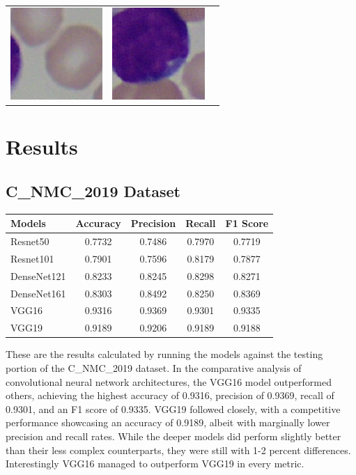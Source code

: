 \documentclass[
	a4paper,
	10pt,
	unnumberedsections,
	twoside,
]{research_article}
\begin{document}
\begin{tabular}{m{3.25cm} m{4cm} m{4cm}}
	\includegraphics[width=3.5cm]{images/Im001_1_window_221.jpg} & \includegraphics[width=3.5cm]{images/Im003_1_window_376.jpg} \\
\end{tabular}

\newpage\onecolumn
\section{Results}

\subsection{C\_NMC\_2019 Dataset}
\begin{table}[ht]
	\centering
	\begin{tabular}{lcccc}
		\hline
		\textbf{Models} & \textbf{Accuracy} & \textbf{Precision} & \textbf{Recall} & \textbf{F1 Score} \\
		\hline
		Resnet50    & 0.7732 & 0.7486 & 0.7970 & 0.7719 \\
		Resnet101   & 0.7901 & 0.7596 & 0.8179 & 0.7877 \\
		DenseNet121 & 0.8233 & 0.8245 & 0.8298 & 0.8271 \\
		DenseNet161 & 0.8303 & 0.8492 & 0.8250 & 0.8369 \\
		VGG16       & 0.9316 & 0.9369 & 0.9301 & 0.9335 \\
		VGG19       & 0.9189 & 0.9206 & 0.9189 & 0.9188 \\
		\hline
	\end{tabular}
\end{table}

These are the results calculated by running the models against the testing portion of the C\_NMC\_2019 dataset. In the comparative analysis of convolutional neural network architectures, the VGG16 model outperformed others, achieving the highest accuracy of 0.9316, precision of 0.9369, recall of 0.9301, and an F1 score of 0.9335. VGG19 followed closely, with a competitive performance showcasing an accuracy of 0.9189, albeit with marginally lower precision and recall rates. While the deeper models did perform slightly better than their less complex counterparts, they were still with 1-2 percent differences. Interestingly VGG16 managed to outperform VGG19 in every metric.
\end{document}
